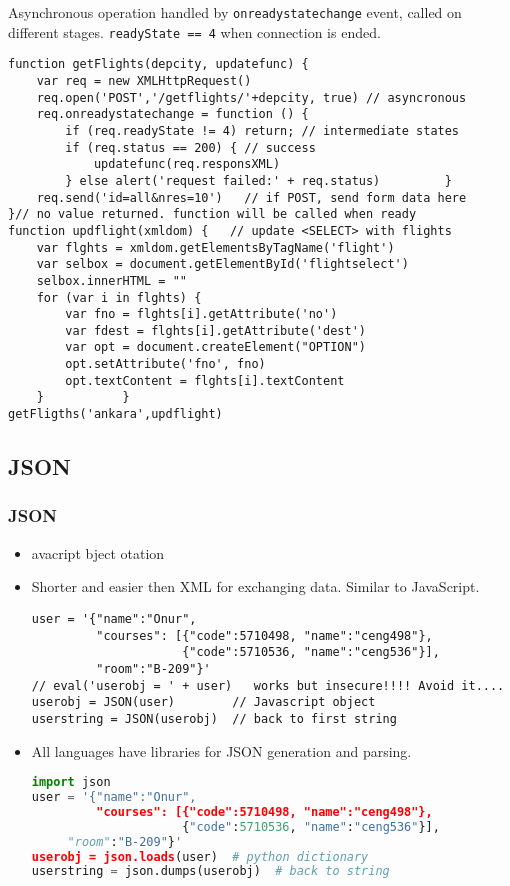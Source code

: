 \documentclass[trans,compress,xcolor=table]{beamer}
\begin{document}
\begin{frame}[fragile]
Asynchronous operation handled by \lstinline!onreadystatechange! event,
called on different stages. \lstinline!readyState == 4! 
when connection is ended. 
\begin{lstlisting}
function getFlights(depcity, updatefunc) {
    var req = new XMLHttpRequest()
    req.open('POST','/getflights/'+depcity, true) // asyncronous
    req.onreadystatechange = function () {
		if (req.readyState != 4) return; // intermediate states
        if (req.status == 200) { // success
            updatefunc(req.responsXML)    
        } else alert('request failed:' + req.status)		 } 
    req.send('id=all&nres=10')   // if POST, send form data here
}// no value returned. function will be called when ready
function updflight(xmldom) {   // update <SELECT> with flights
    var flghts = xmldom.getElementsByTagName('flight')
    var selbox = document.getElementById('flightselect')
    selbox.innerHTML = ""
    for (var i in flghts) {
        var fno = flghts[i].getAttribute('no')
        var fdest = flghts[i].getAttribute('dest')
        var opt = document.createElement("OPTION")
        opt.setAttribute('fno', fno)
        opt.textContent = flghts[i].textContent
    } 			}
getFligths('ankara',updflight)
\end{lstlisting}
\end{frame}

\subsection*{JSON}
\begin{frame}[fragile]
\frametitle{JSON}
\begin{itemize}
\item {}avacript bject otation
\item Shorter and easier then XML for exchanging data. Similar to JavaScript.
\begin{lstlisting}[showstringspaces=false]
user = '{"name":"Onur", 
         "courses": [{"code":5710498, "name":"ceng498"},
                     {"code":5710536, "name":"ceng536"}],
         "room":"B-209"}'           
// eval('userobj = ' + user)   works but insecure!!!! Avoid it....
userobj = JSON(user)		// Javascript object
userstring = JSON(userobj)	// back to first string
\end{lstlisting}
\item All languages have libraries for JSON generation and parsing.
\begin{lstlisting}[language=python,showstringspaces=false]
import json
user = '{"name":"Onur", 
         "courses": [{"code":5710498, "name":"ceng498"},
                     {"code":5710536, "name":"ceng536"}],
	 "room":"B-209"}'           
userobj = json.loads(user)	# python dictionary
userstring = json.dumps(userobj)  # back to string
\end{lstlisting}

\end{itemize}
\end{frame}
\end{document}
